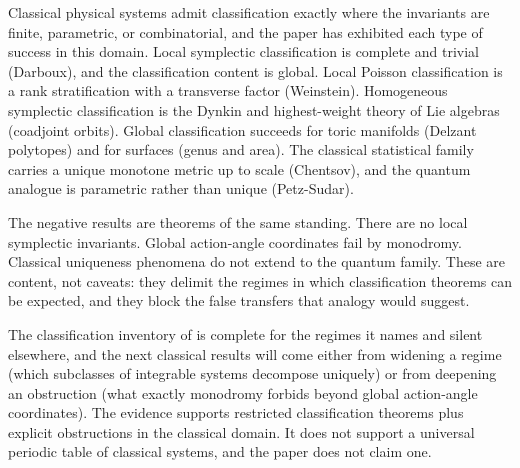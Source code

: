 \documentclass[11pt,letterpaper]{article}
\theoremstyle{definition}
\theoremstyle{remark}
\begin{document}
Classical physical systems admit classification exactly where the invariants are finite, parametric, or combinatorial, and the paper has exhibited each type of success in this domain. Local symplectic classification is complete and trivial (Darboux), and the classification content is global. Local Poisson classification is a rank stratification with a transverse factor (Weinstein). Homogeneous symplectic classification is the Dynkin and highest-weight theory of Lie algebras (coadjoint orbits). Global classification succeeds for toric manifolds (Delzant polytopes) and for surfaces (genus and area). The classical statistical family carries a unique monotone metric up to scale (Chentsov), and the quantum analogue is parametric rather than unique (Petz-Sudar).

The negative results are theorems of the same standing. There are no local symplectic invariants. Global action-angle coordinates fail by monodromy. Classical uniqueness phenomena do not extend to the quantum family. These are content, not caveats: they delimit the regimes in which classification theorems can be expected, and they block the false transfers that analogy would suggest.

The classification inventory of  is complete for the regimes it names and silent elsewhere, and the next classical results will come either from widening a regime (which subclasses of integrable systems decompose uniquely) or from deepening an obstruction (what exactly monodromy forbids beyond global action-angle coordinates). The evidence supports restricted classification theorems plus explicit obstructions in the classical domain. It does not support a universal periodic table of classical systems, and the paper does not claim one.
\end{document}
